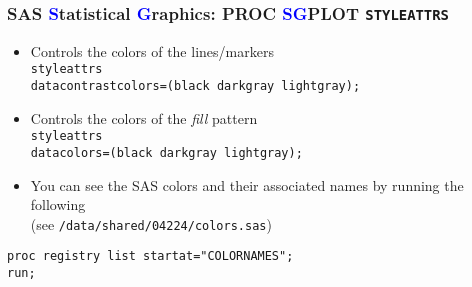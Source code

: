 \documentclass[11pt,pdftex,dvipsnames,usenames,helvetica]{beamer}
\begin{document}
\begin{frame}[fragile]
\frametitle{SAS \textcolor{blue}{S}tatistical \textcolor{blue}{G}raphics:
PROC \textcolor{blue}{SG}PLOT {\tt STYLEATTRS}}
\begin{itemize}
\item Controls the colors of the lines/markers\\
{\tt styleattrs\\ datacontrastcolors=(black darkgray lightgray);}
\item Controls the colors of the {\it fill} pattern\\
{\tt styleattrs\\ datacolors=(black darkgray lightgray);}
\item You can see the SAS colors and their associated names
by running the following\\ (see {\tt /data/shared/04224/colors.sas}) 
\end{itemize}
\begin{verbatim}
proc registry list startat="COLORNAMES";
run;
\end{verbatim}
\end{frame}
\end{document}
